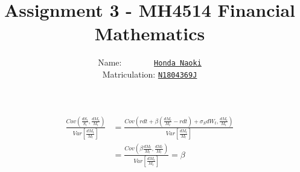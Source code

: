 \documentclass[12pt]{article}
\newenvironment{solution}[2][Solution]{\begin{trivlist}
\item[\hskip \labelsep {\bfseries #1}\hskip \labelsep {\bfseries #2.}]}{\end{trivlist}}
\newenvironment{question}[2][Question]{\begin{trivlist}
\item[\hskip \labelsep {\bfseries #1}\hskip \labelsep {\bfseries #2.}]}{\end{trivlist}}
\begin{document}
 
 
 
\title{Assignment 3 - MH4514 Financial Mathematics}
\author{Name: \ \ \ \ \ \ \  \underline{\texttt{Honda Naoki}}\\ 
Matriculation: \underline{\texttt{N1804369J}}} 

\maketitle

\begin{question}{1}
\end{question}
\begin{solution}[Solution] \\ 
\begin{align*}
    \frac{Cov\left(\frac{dS_t}{S_t}, \frac{dM_t}{M_t}\right)}{Var\left[\frac{dM_t}{M_t}\right]} &= \frac{Cov\left(rdt+\beta \left(\frac{dM_t}{M_t}-rdt\right)+\sigma_S dW_t, \frac{dM_t}{M_t} \right)}{Var\left[\frac{dM_t}{M_t}\right]}\\
    &= \frac{Cov\left(\beta \frac{dM_t}{M_t} , \frac{dM_t}{M_t} \right)}{Var\left[\frac{dM_t}{M_t}\right]} = \beta
\end{align*}
\end{solution}
\end{document}
